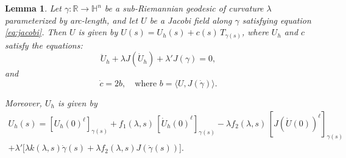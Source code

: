 \documentclass[10pt]{amsart}
\newtheorem{lemma}[theorem]{Lemma}
\theoremstyle{definition}
\theoremstyle{remark}
\numberwithin{equation}{section}
\begin{document}
\begin{lemma}
\label{lem:jacobi}
Let ${\gamma}:{{\mathbb{R}}}\to{{\mathbb{H}}}^n$ be a sub-Riemannian geodesic of curvature ${\lambda}$ parameterized by arc-length, and let $U$ be a Jacobi field along ${\gamma}$ satisfying equation \eqref{eq:jacobi}. Then $U$ is given by $U(s)=U_h(s)+c(s)\,T_{{\gamma}(s)}$,
where $U_h$ and $c$ satisfy the equations:
\begin{equation}
\label{eq:jacobih}
\ddot{U}_h+{\lambda} J(\dot{U}_h)+{\lambda}'J({\gamma})=0,
\end{equation}
and
\begin{equation}
\label{eq:jacobiv}
\dot{c}=2b,\quad \text{where } b={\langle{U,J({\dot{\gamma}})}\rangle}.
\end{equation}

Moreover, $U_h$ is given by
\begin{multline}
\label{eq:explicitUh}
U_h(s)=[{{U_h(0)}^\ell}]_{{\gamma}(s)}+f_1({\lambda}, s)\,[{{\dot{U}_h(0)}^\ell}]_{{\gamma}(s)}-{\lambda} f_2({\lambda}, s)\,[{{J(\dot{U}(0))}^\ell}]_{{\gamma}(s)}
\\
+{\lambda}'\big[{\lambda} k({\lambda}, s){\dot{\gamma}}(s)+{\lambda} f_2({\lambda}, s)J({\dot{\gamma}}(s))\big].
\end{multline}
\end{lemma}
\end{document}
